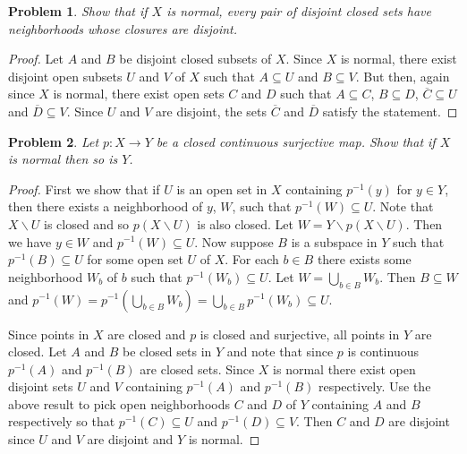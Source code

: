 \documentclass{article}
\newtheorem{problem}{Problem}
\begin{document}
\begin{problem}
Show that if $X$ is normal, every pair of disjoint closed sets have neighborhoods whose closures are disjoint.
\end{problem}
\begin{proof}
Let $A$ and $B$ be disjoint closed subsets of $X$. Since $X$ is normal, there exist disjoint open subsets $U$ and $V$ of $X$ such that $A \subseteq U$ and $B \subseteq V$. But then, again since $X$ is normal, there exist open sets $C$ and $D$ such that $A \subseteq C$, $B \subseteq D$, $\overline{C} \subseteq U$ and $\overline{D} \subseteq V$. Since $U$ and $V$ are disjoint, the sets $\overline{C}$ and $\overline{D}$ satisfy the statement.
\end{proof}

\begin{problem}
\label{normalmap}
Let $p : X \to Y$ be a closed continuous surjective map. Show that if $X$ is normal then so is $Y$.
\end{problem}
\begin{proof}
First we show that if $U$ is an open set in $X$ containing $p^{-1}(y)$ for $y \in Y$, then there exists a neighborhood of $y$, $W$, such that $p^{-1}(W) \subseteq U$. Note that $X \backslash U$ is closed and so $p(X \backslash U)$ is also closed. Let $W = Y \backslash p(X \backslash U)$. Then we have $y \in W$ and $p^{-1}(W) \subseteq U$. Now suppose $B$ is a subspace in $Y$ such that $p^{-1}(B) \subseteq U$ for some open set $U$ of $X$. For each $b \in B$ there exists some neighborhood $W_b$ of $b$ such that $p^{-1}(W_b) \subseteq U$. Let $W = \bigcup_{b \in B} W_b$. Then $B \subseteq W$ and $p^{-1}(W) = p^{-1}(\bigcup_{b \in B} W_b) = \bigcup_{b \in B} p^{-1}(W_b) \subseteq U$.

Since points in $X$ are closed and $p$ is closed and surjective, all points in $Y$ are closed. Let $A$ and $B$ be closed sets in $Y$ and note that since $p$ is continuous $p^{-1}(A)$ and $p^{-1}(B)$ are closed sets. Since $X$ is normal there exist open disjoint sets $U$ and $V$ containing $p^{-1}(A)$ and $p^{-1}(B)$ respectively. Use the above result to pick open neighborhoods $C$ and $D$ of $Y$ containing $A$ and $B$ respectively so that $p^{-1}(C) \subseteq U$ and $p^{-1}(D) \subseteq V$. Then $C$ and $D$ are disjoint since $U$ and $V$ are disjoint and $Y$ is normal.
\end{proof}
\end{document}
